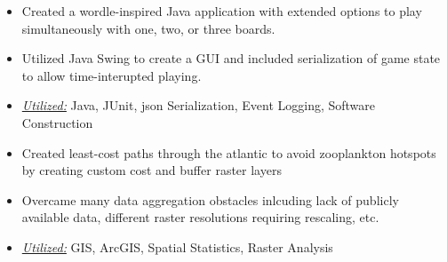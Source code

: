 \begin{itemize}
  \item Created a wordle-inspired Java application with extended options to play simultaneously with one, two, or three boards.
  \item Utilized Java Swing to create a GUI and included serialization of game state to allow time-interupted playing.
  \item \underline{\textit{Utilized:}} Java, JUnit, json Serialization, Event Logging, Software Construction
\end{itemize}
\divider\small

\begin{itemize}
  \item Created least-cost paths through the atlantic to avoid zooplankton hotspots by creating custom cost and buffer raster layers
  \item Overcame many data aggregation obstacles inlcuding lack of publicly available data, different raster resolutions requiring rescaling, etc.
  \item \underline{\textit{Utilized:}} GIS, ArcGIS, Spatial Statistics, Raster Analysis
\end{itemize}





